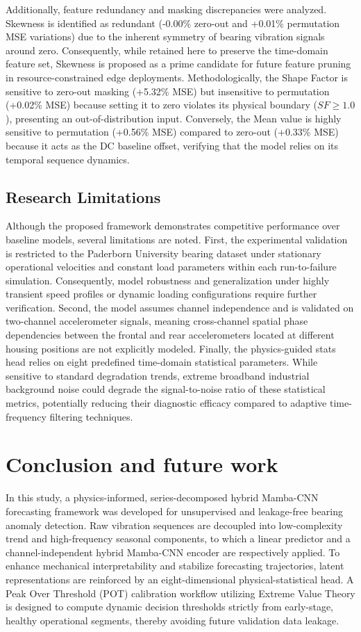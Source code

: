 \documentclass[cmes,article,submit,moreauthors,pdftex]{Definitions/tsp}
\begin{document}
Additionally, feature redundancy and masking discrepancies were analyzed. Skewness is identified as redundant (-0.00\% zero-out and +0.01\% permutation MSE variations) due to the inherent symmetry of bearing vibration signals around zero. Consequently, while retained here to preserve the time-domain feature set, Skewness is proposed as a prime candidate for future feature pruning in resource-constrained edge deployments. Methodologically, the Shape Factor is sensitive to zero-out masking (+5.32\% MSE) but insensitive to permutation (+0.02\% MSE) because setting it to zero violates its physical boundary ($SF \ge 1.0$), presenting an out-of-distribution input. Conversely, the Mean value is highly sensitive to permutation (+0.56\% MSE) compared to zero-out (+0.33\% MSE) because it acts as the DC baseline offset, verifying that the model relies on its temporal sequence dynamics.

\subsection{Research Limitations} \label{sect:s5dot7}
Although the proposed framework demonstrates competitive performance over baseline models, several limitations are noted. First, the experimental validation is restricted to the Paderborn University bearing dataset under stationary operational velocities and constant load parameters within each run-to-failure simulation. Consequently, model robustness and generalization under highly transient speed profiles or dynamic loading configurations require further verification. Second, the model assumes channel independence and is validated on two-channel accelerometer signals, meaning cross-channel spatial phase dependencies between the frontal and rear accelerometers located at different housing positions are not explicitly modeled. Finally, the physics-guided stats head relies on eight predefined time-domain statistical parameters. While sensitive to standard degradation trends, extreme broadband industrial background noise could degrade the signal-to-noise ratio of these statistical metrics, potentially reducing their diagnostic efficacy compared to adaptive time-frequency filtering techniques.

\section{Conclusion and future work} \label{sect:s6}
In this study, a physics-informed, series-decomposed hybrid Mamba-CNN forecasting framework was developed for unsupervised and leakage-free bearing anomaly detection. Raw vibration sequences are decoupled into low-complexity trend and high-frequency seasonal components, to which a linear predictor and a channel-independent hybrid Mamba-CNN encoder are respectively applied. To enhance mechanical interpretability and stabilize forecasting trajectories, latent representations are reinforced by an eight-dimensional physical-statistical head. A Peak Over Threshold (POT) calibration workflow utilizing Extreme Value Theory is designed to compute dynamic decision thresholds strictly from early-stage, healthy operational segments, thereby avoiding future validation data leakage.
\end{document}
